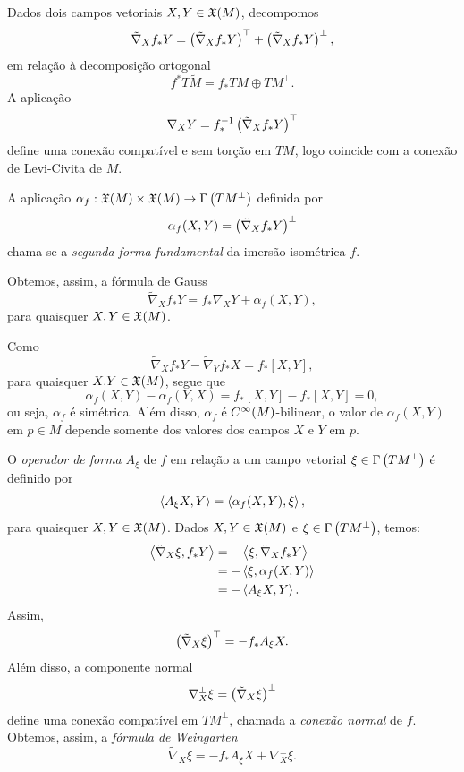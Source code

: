 Dados dois campos vetoriais $X,Y \in \mathfrak{X}(M)$, decompomos
\[ \tilde{\nabla}_X f_* Y = \left( \tilde{\nabla}_X f_* Y \right)^\top + \left( \tilde{\nabla}_X f_* Y \right)^\perp, \]
em relação à decomposição ortogonal
\[ f^* T \tilde{M} = f_* TM \oplus TM^\perp. \]
A aplicação
\[ \nabla_X Y = f_*^{-1} \left( \tilde{\nabla}_X f_* Y \right)^\top \]
define uma conexão compatível e sem torção em $TM$, logo coincide com a conexão de Levi-Civita de $M$.

\begin{definicao}
	A aplicação $\alpha_f: \mathfrak{X}(M) \times \mathfrak{X}(M) \rightarrow \Gamma \left( TM^\perp \right)$ definida por
	\[ \alpha_f (X,Y) = \left( \tilde{\nabla}_X f_* Y \right)^\perp \]
	chama-se a \emph{segunda forma fundamental} da imersão isométrica $f$.
\end{definicao}

Obtemos, assim, a fórmula de Gauss
\[ \tilde{\nabla}_X f_* Y = f_* \nabla_X Y + \alpha_f (X,Y), \]
para quaisquer $X, Y \in \mathfrak{X}(M)$.

\begin{observacao}
	Como
	\[ \tilde{\nabla}_X f_* Y - \tilde{\nabla}_Y f_* X = f_* [X,Y], \]
	para quaisquer $X.Y \in \mathfrak{X}(M)$, segue que
	\[ \alpha_f (X,Y) - \alpha_f(Y,X) = f_* [X,Y] - f_* [X,Y] = 0, \]
	ou seja, $\alpha_f$ é simétrica. Além disso, $\alpha_f$ é $C^\infty(M)$-bilinear, o valor de $\alpha_f (X,Y)$ em $p \in M$ depende somente dos valores dos campos $X$ e $Y$ em $p$.
\end{observacao}

O \emph{operador de forma} $A_\xi$ de $f$ em relação a um campo vetorial $\xi \in \Gamma \left( TM^\perp \right)$ é definido por
\[ \left\langle A_\xi X,Y \right\rangle = \left\langle \alpha_f (X,Y),\xi \right\rangle, \]
para quaisquer $X,Y \in \mathfrak{X}(M)$. Dados $X,Y \in \mathfrak{X}(M)$ e $\xi \in \Gamma \left( TM^\perp \right)$, temos:
\begin{align*}
	\left\langle \tilde{\nabla}_X \xi,f_* Y \right\rangle &= - \left\langle \xi,\tilde{\nabla}_X f_* Y \right\rangle\\
	&= -\left\langle \xi,\alpha_f (X,Y) \right\rangle\\
	&= -\left\langle A_\xi X,Y \right\rangle.
\end{align*}
Assim,
\[ \left( \tilde{\nabla}_X \xi \right)^\top  = -f_* A_\xi X. \]
Além disso, a componente normal
\[ \nabla^\perp_X \xi = \left( \tilde{\nabla}_X \xi \right)^\perp \]
define uma conexão compatível em $TM^\perp$, chamada a \emph{conexão normal} de $f$. Obtemos, assim, a \emph{fórmula de Weingarten}
\[ \tilde{\nabla}_X \xi = - f_* A_\xi X + \nabla^\perp_X \xi. \]

